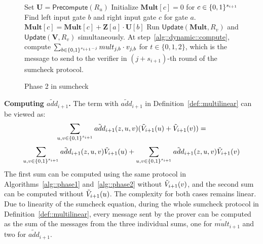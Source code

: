 \begin{figure}[ht!]
	\begin{algorithm}[H]
		\caption{Phase 2 in sumcheck}\label{alg::phase2}
		\begin{algorithmic}[1]
			\State Set $\textbf{U} = \mathsf{Precompute}(R_u)$
			\State Initialize $\textbf{Mult}[c] = 0$ for $c\in\{0,1\}^{s_{i+1}}$
			\State Find left input gate $b$ and right input gate $c$ for gate $a$. 
			\State\label{alg::phase2::init} $\textbf{Mult}[c] = \textbf{Mult}[c]+ \textbf{Z}[a]\cdot\textbf{U}[b]$
			\EndFor
			\EndProcedure
			\State Run $\mathsf{Update}(\textbf{Mult},R_v)$ and $\mathsf{Update}(\textbf{V},R_v)$ simultaneously. At step~\ref{alg::dynamic::compute}, compute $\sum_{b\in\{0,1\}^{s_{i+1}-j}}mult_{j,b}\cdot v_{j,b}$ for $t\in\{0,1,2\}$, which is the message to send to the verifier in $(j+s_{i+1})$-th round of the sumcheck protocol.
			\EndProcedure
		\end{algorithmic}
	\end{algorithm}
\end{figure}

\smallskip\noindent\textbf{Computing $\tilde{add}_{i+1}$.} The term with $\tilde{add}_{i+1}$ in Definition~\ref{def::multilinear} can be viewed as: 
\[\sum_{u,v\in\{0,1\}^{s_{i+1}}}\tilde{add}_{i+1}(z,u,v)(\tilde{V}_{i+1}(u)+\tilde{V}_{i+1}(v)) =
\]
\[
 \sum_{u,v\in\{0,1\}^{s_{i+1}}}\tilde{add}_{i+1}(z,u,v)\tilde{V}_{i+1}(u)+\sum_{u,v\in\{0,1\}^{s_{i+1}}}\tilde{add}_{i+1}(z,u,v)\tilde{V}_{i+1}(v)
\]
The first sum can be computed using the same protocol in Algorithms~\ref{alg::phase1} and~\ref{alg::phase2} without $\tilde{V}_{i+1}(v)$, and the second sum can be computed without $\tilde{V}_{i+1}(u)$. The complexity for both cases remains linear. Due to linearity of the sumcheck equation, during the whole sumcheck protocol in Definition~\ref{def::multilinear}, every message sent by the prover can be computed as the sum of the messages from the three individual sums, one for $\tilde{mult}_{i+1}$ and two for $\tilde{add}_{i+1}$. 

